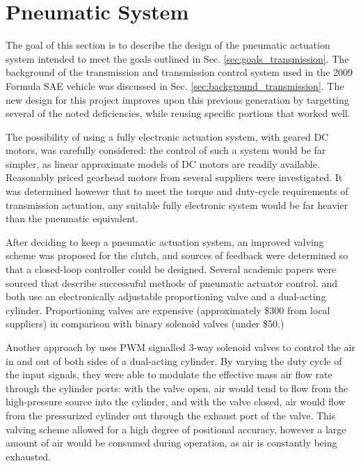 \section{Pneumatic System}

The goal of this section is to describe the design of the pneumatic actuation system intended to meet the goals outlined in Sec. \ref{sec:goals_transmission}. The background of the transmission and transmission control system used in the 2009 Formula SAE vehicle was discussed in Sec. \ref{sec:background_transmission}. The new design for this project improves upon this previous generation by targetting several of the noted deficiencies, while reusing specific portions that worked well.

The possibility of using a fully electronic actuation system, with geared DC motors, was carefully considered: the control of such a system would be far simpler, as linear approximate models of DC motors are readily available. Reasonably priced gearhead motors from several suppliers were investigated. It was determined however that to meet the torque and duty-cycle requirements of transmission actuation, any suitable fully electronic system would be far heavier than the pneumatic equivalent.

After deciding to keep a pneumatic actuation system, an improved valving scheme was proposed for the clutch, and sources of feedback were determined so that a closed-loop controller could be designed. Several academic papers were sourced that describe successuful methods of pneumatic actuator control.  and \citet{adaptive_pneumatic} both use an electronically adjustable proportioning valve and a dual-acting cylinder. Proportioning valves are expensive (approximately \$300 from local suppliers) in comparison with binary solenoid valves (under \$50.)

Another approach by \citet{accurate_position} uses PWM signalled 3-way solenoid valves to control the air in and out of both sides of a dual-acting cylinder. By varying the duty cycle of the input signals, they were able to modulate the effective mass air flow rate through the cylinder ports: with the valve open, air would tend to flow from the high-pressure source into the cylinder, and with the valve closed, air would flow from the pressurized cylinder out through the exhaust port of the valve. This valving scheme allowed for a high degree of positional accuracy, however a large amount of air would be consumed during operation, as air is constantly being exhausted.

